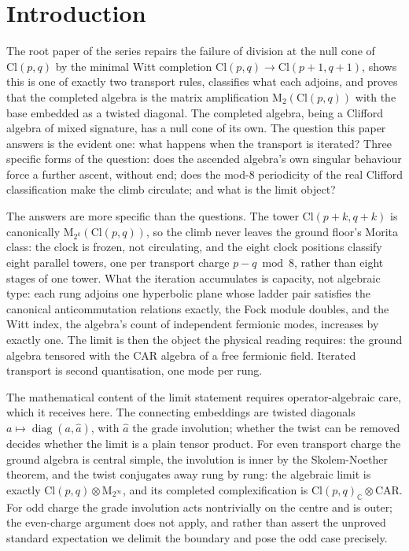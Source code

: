 \documentclass[11pt]{article}
\theoremstyle{definition}
\newcommand{\Cl}{\mathrm{Cl}}
\newcommand{\C}{\mathbb{C}}
\newcommand{\Mat}{\mathrm{M}}
\newcommand{\CAR}{\mathrm{CAR}}
\begin{document}
\newpage
\section{Introduction}\label{sec:intro}

The root paper of the series \cite{ButlerT1} repairs the failure of division at the null cone of $\Cl(p,q)$ by the minimal Witt completion $\Cl(p,q) \to \Cl(p{+}1,q{+}1)$, shows this is one of exactly two transport rules, classifies what each adjoins, and proves that the completed algebra is the matrix amplification $\Mat_2(\Cl(p,q))$ with the base embedded as a twisted diagonal. The completed algebra, being a Clifford algebra of mixed signature, has a null cone of its own. The question this paper answers is the evident one: what happens when the transport is iterated? Three specific forms of the question: does the ascended algebra's own singular behaviour force a further ascent, without end; does the mod-8 periodicity of the real Clifford classification make the climb circulate; and what is the limit object?

The answers are more specific than the questions. The tower $\Cl(p{+}k,q{+}k)$ is canonically $\Mat_{2^k}(\Cl(p,q))$, so the climb never leaves the ground floor's Morita class: the clock is frozen, not circulating, and the eight clock positions classify eight parallel towers, one per transport charge $p - q \bmod 8$, rather than eight stages of one tower. What the iteration accumulates is capacity, not algebraic type: each rung adjoins one hyperbolic plane whose ladder pair satisfies the canonical anticommutation relations exactly, the Fock module doubles, and the Witt index, the algebra's count of independent fermionic modes, increases by exactly one. The limit is then the object the physical reading requires: the ground algebra tensored with the CAR algebra of a free fermionic field. Iterated transport is second quantisation, one mode per rung.

The mathematical content of the limit statement requires operator-algebraic care, which it receives here. The connecting embeddings are twisted diagonals $a \mapsto \operatorname{diag}(a, \hat a)$, with $\hat a$ the grade involution; whether the twist can be removed decides whether the limit is a plain tensor product. For even transport charge the ground algebra is central simple, the involution is inner by the Skolem-Noether theorem, and the twist conjugates away rung by rung: the algebraic limit is exactly $\Cl(p,q) \otimes \Mat_{2^\infty}$, and its completed complexification is $\Cl(p,q)_\C \otimes \CAR$. For odd charge the grade involution acts nontrivially on the centre and is outer; the even-charge argument does not apply, and rather than assert the unproved standard expectation we delimit the boundary and pose the odd case precisely.
\end{document}

